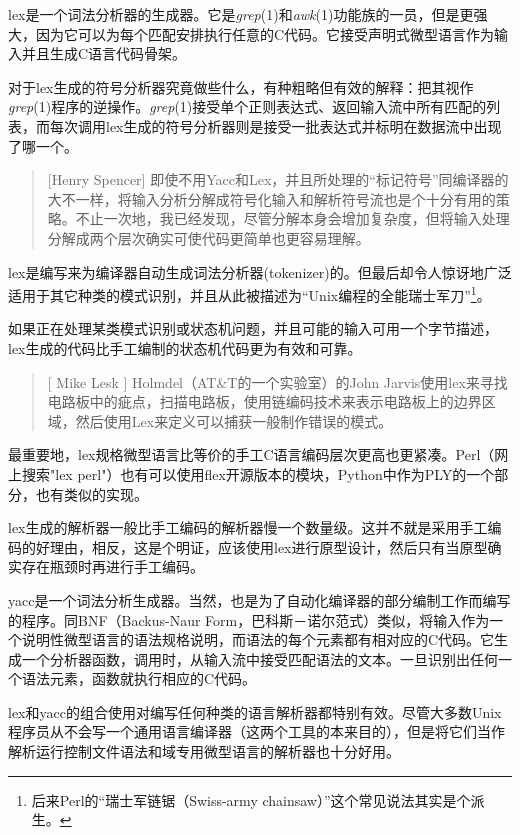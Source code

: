 \documentclass[12pt,oneside]{ctexbook}
\begin{document}
\begin{common-format}
lex是一个词法分析器的生成器。它是\textit{grep}(1)和\textit{awk}(1)功能族的一员，但是更强大，因为它可以为每个匹配安排执行任意的C代码。它接受声明式微型语言作为输入并且生成C语言代码骨架。

对于lex生成的符号分析器究竟做些什么，有种粗略但有效的解释：把其视作\textit{grep}(1)程序的逆操作。\textit{grep}(1)接受单个正则表达式、返回输入流中所有匹配的列表，而每次调用lex生成的符号分析器则是接受一批表达式并标明在数据流中出现了哪一个。

\begin{quote}[Henry Spencer]
即使不用Yacc和Lex，并且所处理的“标记符号”同编译器的大不一样，将输入分析分解成符号化输入和解析符号流也是个十分有用的策略。不止一次地，我已经发现，尽管分解本身会增加复杂度，但将输入处理分解成两个层次确实可使代码更简单也更容易理解。
\end{quote}

lex是编写来为编译器自动生成词法分析器(tokenizer)的。但最后却令人惊讶地广泛适用于其它种类的模式识别，并且从此被描述为“Unix编程的全能瑞士军刀”\footnote{后来Perl的“瑞士军链锯（Swiss-army chainsaw）”这个常见说法其实是个派生。}。

如果正在处理某类模式识别或状态机问题，并且可能的输入可用一个字节描述，lex生成的代码比手工编制的状态机代码更为有效和可靠。

\begin{quote}[ Mike Lesk 	]
Holmdel（AT\&{}T的一个实验室）的John Jarvis使用lex来寻找电路板中的疵点，扫描电路板，使用链编码技术来表示电路板上的边界区域，然后使用Lex来定义可以捕获一般制作错误的模式。
\end{quote}

最重要地，lex规格微型语言比等价的手工C语言编码层次更高也更紧凑。Perl（网上搜索"lex perl"）也有可以使用flex开源版本的模块，Python中作为PLY的一个部分，也有类似的实现。

lex生成的解析器一般比手工编码的解析器慢一个数量级。这并不就是采用手工编码的好理由，相反，这是个明证，应该使用lex进行原型设计，然后只有当原型确实存在瓶颈时再进行手工编码。

yacc是一个词法分析生成器。当然，也是为了自动化编译器的部分编制工作而编写的程序。同BNF（Backus-Naur Form，巴科斯－诺尔范式）类似，将输入作为一个说明性微型语言的语法规格说明，而语法的每个元素都有相对应的C代码。它生成一个分析器函数，调用时，从输入流中接受匹配语法的文本。一旦识别出任何一个语法元素，函数就执行相应的C代码。

lex和yacc的组合使用对编写任何种类的语言解析器都特别有效。尽管大多数Unix程序员从不会写一个通用语言编译器（这两个工具的本来目的），但是将它们当作解析运行控制文件语法和域专用微型语言的解析器也十分好用。


\end{common-format}
\end{document}
